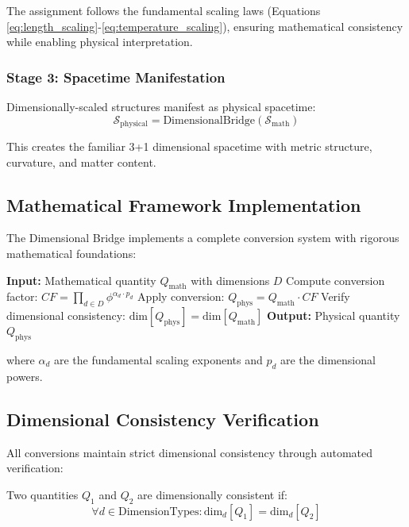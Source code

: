 The assignment follows the fundamental scaling laws (Equations \ref{eq:length_scaling}-\ref{eq:temperature_scaling}), ensuring mathematical consistency while enabling physical interpretation.

\subsubsection{Stage 3: Spacetime Manifestation}
Dimensionally-scaled structures manifest as physical spacetime:
\begin{equation}
\mathcal{S}_{\text{physical}} = \text{DimensionalBridge}(\mathcal{S}_{\text{math}})
\end{equation}

This creates the familiar 3+1 dimensional spacetime with metric structure, curvature, and matter content.

\subsection{Mathematical Framework Implementation}

The Dimensional Bridge implements a complete conversion system with rigorous mathematical foundations:

\begin{algorithm}[H]
\begin{algorithmic}[1]
\State \textbf{Input:} Mathematical quantity $Q_{\text{math}}$ with dimensions $D$
\State Compute conversion factor: $CF = \prod_{d \in D} \phi^{\alpha_d \cdot p_d}$
\State Apply conversion: $Q_{\text{phys}} = Q_{\text{math}} \cdot CF$
\State Verify dimensional consistency: $\text{dim}[Q_{\text{phys}}] = \text{dim}[Q_{\text{math}}]$
\State \textbf{Output:} Physical quantity $Q_{\text{phys}}$
\end{algorithmic}
\end{algorithm}

where $\alpha_d$ are the fundamental scaling exponents and $p_d$ are the dimensional powers.

\subsection{Dimensional Consistency Verification}

All conversions maintain strict dimensional consistency through automated verification:

\begin{definition}
Two quantities $Q_1$ and $Q_2$ are dimensionally consistent if:
\begin{equation}
\forall d \in \text{DimensionTypes}: \text{dim}_d[Q_1] = \text{dim}_d[Q_2]
\end{equation}
\end{definition}


